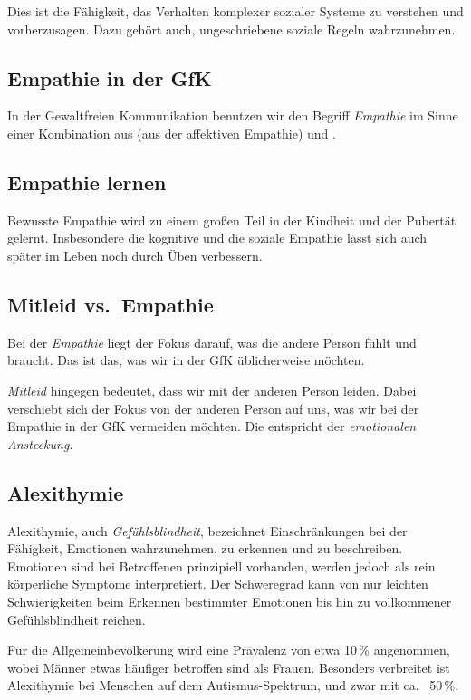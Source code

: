 Dies ist die Fähigkeit, das Verhalten komplexer sozialer Systeme zu verstehen und vorherzusagen. Dazu gehört auch, ungeschriebene soziale Regeln wahrzunehmen.


\subsection{Empathie in der GfK}

In der Gewaltfreien Kommunikation benutzen wir den Begriff \emph{Empathie} im Sinne einer Kombination aus  (aus der affektiven Empathie) und .


\subsection{Empathie lernen}

Bewusste Empathie wird zu einem großen Teil in der Kindheit und der Pubertät gelernt. Insbesondere die kognitive und die soziale Empathie lässt sich auch später im Leben noch durch Üben verbessern.


\subsection{Mitleid vs.~Empathie}
\label{mitleid}

Bei der \emph{Empathie} liegt der Fokus darauf, was die andere Person fühlt und braucht. Das ist das, was wir in der GfK üblicherweise möchten.

\emph{Mitleid} hingegen bedeutet, dass wir mit der anderen Person leiden. Dabei verschiebt sich der Fokus von der anderen Person auf uns, was wir bei der Empathie in der GfK vermeiden möchten. Die entspricht der \emph{emotionalen Ansteckung}.


\subsection{Alexithymie}
\label{alexithymie}

Alexithymie, auch \emph{Gefühlsblindheit}, bezeichnet Einschränkungen bei der Fähigkeit, Emotionen wahrzunehmen, zu erkennen und zu beschreiben. Emotionen sind bei Betroffenen prinzipiell vorhanden, werden jedoch als rein körperliche Symptome interpretiert. Der Schweregrad kann von nur leichten Schwierigkeiten beim Erkennen bestimmter Emotionen bis hin zu vollkommener \glqq Gefühlsblindheit\grqq{} reichen.

Für die Allgemeinbevölkerung wird eine Prävalenz von etwa 10\,\% angenommen, wobei Männer etwas häufiger betroffen sind als Frauen. Besonders verbreitet ist Alexithymie bei Menschen auf dem Autismus-Spektrum, und zwar mit ca.~ 50\,\%.
